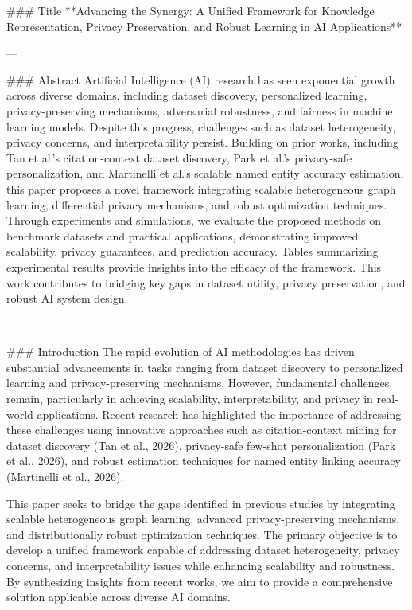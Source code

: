 ### Title
**Advancing the Synergy: A Unified Framework for Knowledge Representation, Privacy Preservation, and Robust Learning in AI Applications**

---

### Abstract
Artificial Intelligence (AI) research has seen exponential growth across diverse domains, including dataset discovery, personalized learning, privacy-preserving mechanisms, adversarial robustness, and fairness in machine learning models. Despite this progress, challenges such as dataset heterogeneity, privacy concerns, and interpretability persist. Building on prior works, including Tan et al.'s citation-context dataset discovery, Park et al.'s privacy-safe personalization, and Martinelli et al.'s scalable named entity accuracy estimation, this paper proposes a novel framework integrating scalable heterogeneous graph learning, differential privacy mechanisms, and robust optimization techniques. Through experiments and simulations, we evaluate the proposed methods on benchmark datasets and practical applications, demonstrating improved scalability, privacy guarantees, and prediction accuracy. Tables summarizing experimental results provide insights into the efficacy of the framework. This work contributes to bridging key gaps in dataset utility, privacy preservation, and robust AI system design.

---

### Introduction
The rapid evolution of AI methodologies has driven substantial advancements in tasks ranging from dataset discovery to personalized learning and privacy-preserving mechanisms. However, fundamental challenges remain, particularly in achieving scalability, interpretability, and privacy in real-world applications. Recent research has highlighted the importance of addressing these challenges using innovative approaches such as citation-context mining for dataset discovery (Tan et al., 2026), privacy-safe few-shot personalization (Park et al., 2026), and robust estimation techniques for named entity linking accuracy (Martinelli et al., 2026).

This paper seeks to bridge the gaps identified in previous studies by integrating scalable heterogeneous graph learning, advanced privacy-preserving mechanisms, and distributionally robust optimization techniques. The primary objective is to develop a unified framework capable of addressing dataset heterogeneity, privacy concerns, and interpretability issues while enhancing scalability and robustness. By synthesizing insights from recent works, we aim to provide a comprehensive solution applicable across diverse AI domains.

